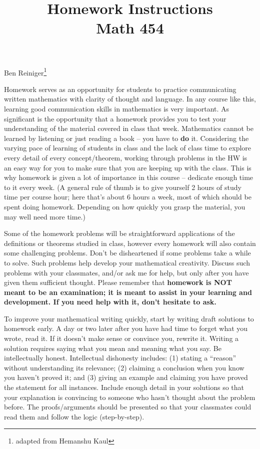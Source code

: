 \documentclass[11pt]{amsart}
\begin{document}
\title{Homework Instructions \\ Math 454 }
\maketitle
\vspace{-2.2em}\begin{center}\small Ben Reiniger\footnote{adapted from Hemanshu Kaul}
\end{center}
\thispagestyle{empty}
\vspace{1em}

Homework serves as an opportunity for students to practice 
communicating written mathematics with clarity of thought and language.  In any course like
this, learning good communication skills in mathematics is very important. As significant is the
opportunity that a homework provides you to test your understanding of the material covered in
class that week. Mathematics cannot be learned by listening or just reading a book -- you have to
\textbf{do} it. Considering the varying pace of learning of students in class and the lack of class time to explore every detail of every concept/theorem, working through problems in the HW is an easy way for you to make sure that you are keeping up with the class. This is why homework is given a lot of importance in this course -- dedicate enough time to it every week.  (A general rule of thumb is to give yourself 2 hours of study time per course hour; here that's about 6 hours a week, most of which should be spent doing homework.  Depending on how quickly you grasp the material, you may well need more time.)

Some of the homework problems will be straightforward applications of the definitions or theorems studied in class, however every homework will also contain some challenging problems. Don't be disheartened if some problems take a while to solve. Such problems help develop your mathematical creativity. Discuss such problems with your classmates, and/or ask me for help, but only after you have given them sufficient thought. Please remember that
\textbf{homework is NOT meant to be an examination; it is meant to assist in your learning and development. If you need help with it, don't hesitate to ask.}

To improve your mathematical writing quickly, start by writing draft solutions to homework
early. A day or two later after you have had time to forget what you wrote, read it. If it doesn't make sense or convince you, rewrite it. Writing a solution requires saying what you mean and meaning what you say.  Be intellectually honest.  Intellectual dishonesty includes: (1) stating a ``reason'' without understanding its relevance;  (2) claiming a conclusion when you know you haven't proved it; and (3) giving an example and claiming you have proved the statement for all instances. Include enough detail in your solutions so that your explanation is convincing to someone who hasn't thought about the problem before. The proofs/arguments should be presented so that your classmates could read them and follow the logic (step-by-step).
\end{document}

